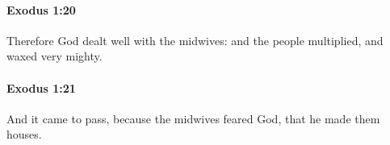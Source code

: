 		\paragraph{Exodus 1:20} %
			\label{EXODUS-1-20}

			Therefore God dealt well with the midwives: and the people multiplied, and waxed very mighty.


		\paragraph{Exodus 1:21} %
			\label{EXODUS-1-21}

			And it came to pass, because the midwives feared God, that he made them houses.


